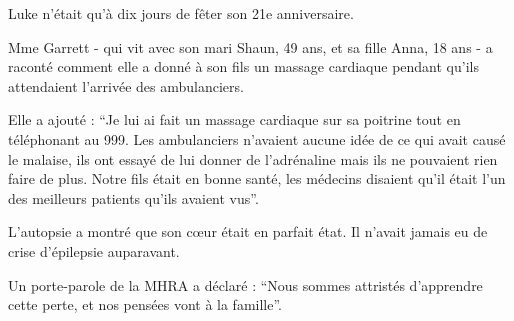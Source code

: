 Luke n'était qu'à dix jours de fêter son 21e anniversaire.

Mme Garrett - qui vit avec son mari Shaun, 49 ans, et sa fille Anna, 18 ans - a
raconté comment elle a donné à son fils un massage cardiaque pendant qu'ils
attendaient l'arrivée des ambulanciers.

Elle a ajouté : “Je lui ai fait un massage cardiaque sur sa poitrine tout en
téléphonant au 999. Les ambulanciers n'avaient aucune idée de ce qui avait causé
le malaise, ils ont essayé de lui donner de l'adrénaline mais ils ne pouvaient
rien faire de plus. Notre fils était en bonne santé, les médecins disaient qu'il
était l'un des meilleurs patients qu'ils avaient vus”.

L'autopsie a montré que son cœur était en parfait état. Il n'avait jamais eu de
crise d'épilepsie auparavant.

Un porte-parole de la MHRA a déclaré : “Nous sommes attristés d'apprendre cette
perte, et nos pensées vont à la famille”.


